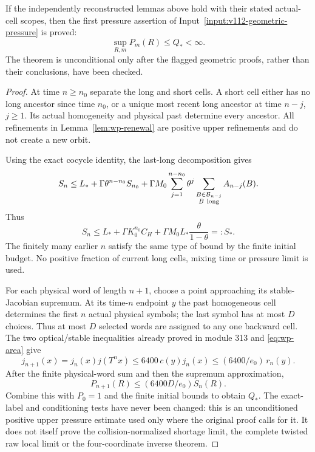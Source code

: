 \begin{theorem}
\label{thm:wp-conclusion}
If the independently reconstructed lemmas above hold with their
stated actual-cell scopes, then the first pressure assertion of
Input~\ref{input:v112-geometric-pressure} is proved:
\[
                   \sup_{R,m}P_m(R)\le Q_*<\infty.
\]
The theorem is unconditional only after the flagged geometric
proofs, rather than their conclusions, have been checked.
\end{theorem}

\begin{proof}
At time $n\ge n_0$ separate the long and short cells.
A short cell either has no long ancestor since time $n_0$, or a
unique most recent long ancestor at time $n-j$, $j\ge1$.
Its actual homogeneity and physical past determine every ancestor.
All refinements in Lemma~\ref{lem:wp-renewal} are positive upper
refinements and do not create a new orbit.

Using the exact cocycle identity, the last-long decomposition gives
\[
 S_n\le L_*+\Gamma\theta^{n-n_0}S_{n_0}
       +\Gamma M_0\sum_{j=1}^{n-n_0}
             \theta^j
             \sum_{\substack{B\in\mathcal B_{n-j}\\ B\ {\rm long}}}
                    A_{n-j}(B).
\]
Thus
\[
 S_n\le L_*+\Gamma K_0^{n_0}C_H
                 +\Gamma M_0 L_*\frac{\theta}{1-\theta}
                 =:S_*.
\]
The finitely many earlier $n$ satisfy the same type of bound by the
finite initial budget.  No positive fraction of current long cells,
mixing time or pressure limit is used.

For each physical word of length $n+1$, choose a point approaching
its stable-Jacobian supremum.
At its time-$n$ endpoint $y$ the past homogeneous cell determines
the first $n$ actual physical symbols; the last symbol has at most
$D$ choices.  Thus at most $D$ selected words are assigned to any
one backward cell.
The two optical/stable inequalities already proved in module 313
and \eqref{eq:wp-area} give
\[
 j_{n+1}(x)=j_n(x)j(T^nx)
       \le6400\,c(y)j_n(x)
       \le(6400/e_0)\,r_n(y).
\]
After the finite physical-word sum and then the supremum approximation,
\[
 P_{n+1}(R)\le(6400D/e_0)S_n(R).
\]
Combine this with $P_0=1$ and the finite initial bounds to obtain
$Q_*$.  The exact-label and conditioning tests have never been
changed: this is an unconditioned positive upper pressure estimate
used only where the original proof calls for it.
It does not itself prove the collision-normalized shortage limit,
the complete twisted raw local limit or the four-coordinate inverse
theorem.
\end{proof}

